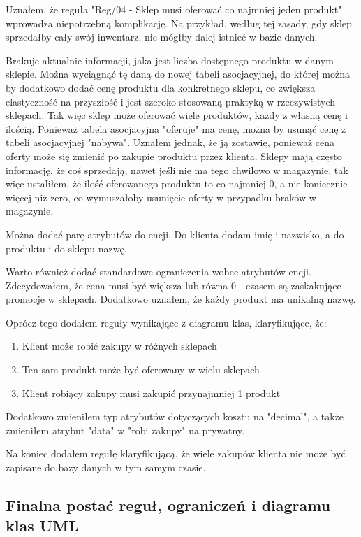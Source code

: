\documentclass[a4paper,12pt]{article}
\begin{document}
Uznałem, że reguła "Reg/04 - Sklep musi oferować co najmniej jeden produkt" wprowadza niepotrzebną komplikację. Na przykład, według tej zasady, gdy sklep sprzedałby cały swój inwentarz, nie mógłby dalej istnieć w bazie danych.

Brakuje aktualnie informacji, jaka jest liczba dostępnego produktu w danym sklepie. Można wyciągnąć tę daną do nowej tabeli asocjacyjnej, do której można by dodatkowo dodać cenę produktu dla konkretnego sklepu, co zwiększa elastyczność na przyszłość i jest szeroko stosowaną praktyką w rzeczywistych sklepach. Tak więc sklep może oferować wiele produktów, każdy z własną cenę i ilością. 
Ponieważ tabela asocjacyjna "oferuje" ma cenę, można by usunąć cenę z tabeli asocjacyjnej "nabywa". Uznałem jednak, że ją zostawię, ponieważ cena oferty może się zmienić po zakupie produktu przez klienta. 
Sklepy mają często informację, że coś sprzedają, nawet jeśli nie ma tego chwilowo w magazynie, tak więc ustaliłem, że ilość oferowanego produktu to co najmniej 0, a nie koniecznie więcej niż zero, co wymuszałoby usunięcie oferty w przypadku braków w magazynie.

Można dodać parę atrybutów do encji. Do klienta dodam imię i nazwisko, a do produktu i do sklepu nazwę.

Warto również dodać standardowe ograniczenia wobec atrybutów encji. Zdecydowałem, że cena musi być większa lub równa 0 - czasem są zaskakujące promocje w sklepach. Dodatkowo uznałem, że każdy produkt ma unikalną nazwę.

Oprócz tego dodałem reguły wynikające z diagramu klas, klaryfikujące, że:

\begin{enumerate}
    \item Klient może robić zakupy w różnych sklepach
    \item Ten sam produkt może być oferowany w wielu sklepach
    \item Klient robiący zakupy musi zakupić przynajmniej 1 produkt
\end{enumerate}

Dodatkowo zmieniłem typ atrybutów dotyczących kosztu na "decimal", a także zmieniłem atrybut "data" w "robi zakupy" na prywatny.

Na koniec dodałem regułę klaryfikującą, że wiele zakupów klienta nie może być zapisane do bazy danych w tym samym czasie.

\newpage
\subsection{Finalna postać reguł, ograniczeń i diagramu klas UML}
\end{document}

